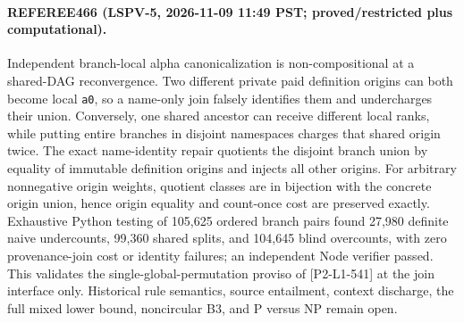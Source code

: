 \paragraph{REFEREE466 (LSPV-5, 2026-11-09 11:49 PST; proved/restricted plus computational).}
Independent branch-local alpha canonicalization is non-compositional at a
shared-DAG reconvergence.  Two different private paid definition origins can
both become local \texttt{a0}, so a name-only join falsely identifies them and
undercharges their union.  Conversely, one shared ancestor can receive
different local ranks, while putting entire branches in disjoint namespaces
charges that shared origin twice.  The exact name-identity repair quotients the
disjoint branch union by equality of immutable definition origins and injects
all other origins.  For arbitrary nonnegative origin weights, quotient classes
are in bijection with the concrete origin union, hence origin equality and
count-once cost are preserved exactly.  Exhaustive Python testing of 105,625
ordered branch pairs found 27,980 definite naive undercounts, 99,360 shared
splits, and 104,645 blind overcounts, with zero provenance-join cost or
identity failures; an independent Node verifier passed.  This validates the
single-global-permutation proviso of [P2-L1-541] at the join interface only.
Historical rule semantics, source entailment, context discharge, the full
mixed lower bound, noncircular B3, and P versus NP remain open.
